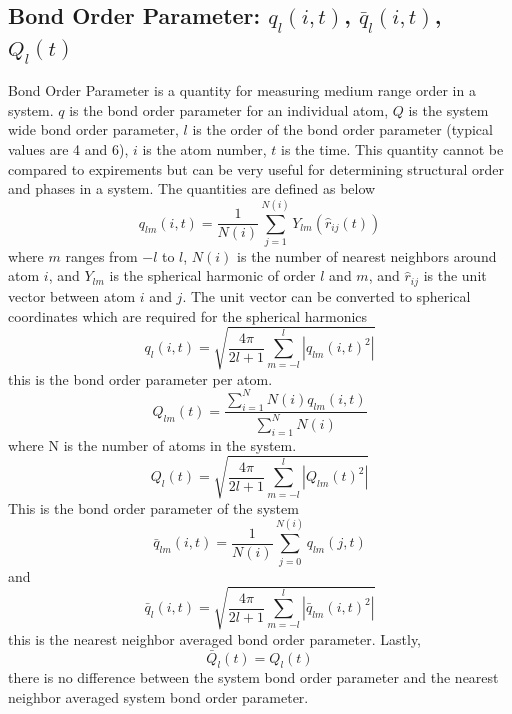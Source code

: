 \documentclass{article}
\begin{document}
\subsection{Bond Order Parameter: $q_l(i,t)$, $\bar{q}_l(i,t)$, $Q_l(t)$} \label{sec::BOP}
Bond Order Parameter is a quantity for measuring medium range order in a system.  $q$ is the bond order parameter for an individual atom, $Q$ is the system wide bond order parameter, $l$ is the order of the bond order parameter (typical values are 4 and 6), $i$ is the atom number, $t$ is the time.  This quantity cannot be compared to expirements but can be very useful for determining structural order and phases in a system.  The quantities are defined as below
\begin{equation}
q_{lm}(i,t) = \frac{1}{N(i)}\sum_{j=1}^{N(i)}Y_{lm}(\hat{r}_{ij}(t))
\end{equation}
where $m$ ranges from $-l$ to $l$, $N(i)$ is the number of nearest neighbors around atom $i$, and $Y_{lm}$ is the spherical harmonic of order $l$ and $m$, and $\hat{r}_{ij}$ is the unit vector between atom $i$ and $j$.  The unit vector can be converted to spherical coordinates which are required for the spherical harmonics
\begin{equation}
q_l(i,t) = \sqrt{\frac{4\pi}{2l+1} \sum_{m=-l}^l\left|q_{lm}(i,t)^2\right|}
\end{equation}
this is the bond order parameter per atom.
\begin{equation}
Q_{lm}(t) = \frac{\sum_{i=1}^NN(i)q_{lm}(i,t)}{\sum_{i=1}^NN(i)}
\end{equation}
where N is the number of atoms in the system.
\begin{equation}
Q_l(t) = \sqrt{\frac{4\pi}{2l+1} \sum_{m=-l}^l\left|Q_{lm}(t)^2\right|}
\end{equation}
This is the bond order parameter of the system
\begin{equation}
\bar{q}_{lm}(i,t) = \frac{1}{N(i)}\sum_{j=0}^{N(i)}q_{lm}(j,t)
\end{equation}
and 
\begin{equation}
\bar{q}_l(i,t) = \sqrt{\frac{4\pi}{2l+1} \sum_{m=-l}^l\left|\bar{q}_{lm}(i,t)^2\right|}
\end{equation}
this is the nearest neighbor averaged bond order parameter.  Lastly,
\begin{equation}
\bar{Q}_l(t) = Q_l(t)
\end{equation}
there is no difference between the system bond order parameter and the nearest neighbor averaged system bond order parameter.
\end{document}
